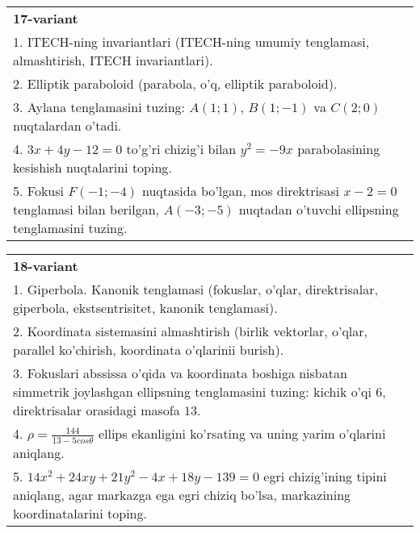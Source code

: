 \documentclass{article}
\begin{document}
\begin{tabular}{m{17cm}}
\textbf{17-variant}\\
1. ITECH-ning invariantlari (ITECH-ning umumiy tenglamasi, almashtirish, ITECH invariantlari).\\

2. Elliptik paraboloid (parabola, o'q, elliptik paraboloid).\\

3. Aylana tenglamasini tuzing: $A(1;1)$, $B(1;-1)$ va $C(2;0)$ nuqtalardan o'tadi.\\

4. $3x + 4y - 12 = 0$ to'g'ri chizig'i bilan $y^{2} = - 9x$ parabolasining kesishish nuqtalarini toping.  \\

5. Fokusi $F( - 1; - 4)$ nuqtasida bo'lgan, mos direktrisasi $x - 2 = 0$ tenglamasi bilan berilgan, $A( - 3; - 5)$ nuqtadan o'tuvchi ellipsning tenglamasini tuzing.  
\end{tabular}
\vspace{1cm}


\begin{tabular}{m{17cm}}
\textbf{18-variant}\\
1. Giperbola. Kanonik tenglamasi (fokuslar, o'qlar, direktrisalar, giperbola, ekstsentrisitet, kanonik tenglamasi).\\

2. Koordinata sistemasini almashtirish (birlik vektorlar, o'qlar, parallel ko'chirish, koordinata o'qlarinii burish).\\

3. Fokuslari abssissa o'qida va koordinata boshiga nisbatan simmetrik joylashgan ellipsning tenglamasini tuzing: kichik o'qi $6$, direktrisalar orasidagi masofa $13$.\\

4. $\rho = \frac{144}{13 - 5cos\theta}$ ellips ekanligini ko'rsating va uning yarim o'qlarini aniqlang.\\

5. $14x^{2} + 24xy + 21y^{2} - 4x + 18y - 139 = 0$ egri chizig'ining tipini aniqlang, agar markazga ega egri chiziq bo'lsa, markazining koordinatalarini toping.  
\end{tabular}
\vspace{1cm}
\end{document}
